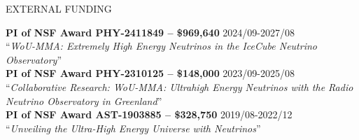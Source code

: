 \documentclass{resume} %
\begin{document}
\begin{rSection}{EXTERNAL FUNDING}

\textbf{PI of NSF Award PHY-2411849 -- \$969,640} \hfill 2024/09-2027/08\\
``\textit{WoU-MMA: Extremely High Energy Neutrinos in the IceCube Neutrino Observatory}'' \\

\textbf{PI of NSF Award PHY-2310125 -- \$148,000} \hfill 2023/09-2025/08\\
``\textit{Collaborative Research: WoU-MMA: Ultrahigh Energy Neutrinos with the Radio Neutrino Observatory in Greenland}'' \\
  

\textbf{PI of NSF Award AST-1903885 -- \$328,750} \hfill 2019/08-2022/12\\
``\textit{Unveiling the Ultra-High Energy Universe with Neutrinos}'' \\


\end{rSection}
\end{document}
